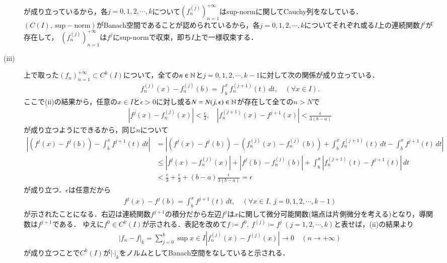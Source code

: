 \begin{prf}
\begin{description}
\begin{align}
	\end{align}
	が成り立っているから，各$j = 0,1,2,\cdots,k$について$\left(f_n^{(j)}\right)_{n=1}^{+\infty}$はsup-normに関してCauchy列をなしている．
	$(C(I),\ \mathrm{sup-norm})$がBanach空間であることが認められているから，各$j = 0,1,2,\cdots,k$についてそれぞれ或る$I$上の連続関数$f^j$が存在して，
	$\left(f_n^{(j)}\right)_{n=1}^{+\infty}$は$f^j$にsup-normで収束，即ち$I$上で一様収束する．\\
	\item[\rm{(iii)}] 上で取った$(f_n)_{n=1}^{+\infty} \subset C^k(I)$について，全ての$n \in \mathbb{N}$と$j = 0,1,2,\cdots,k-1$に対して次の関係が成り立っている．
	\begin{align}
		f_n^{(j)}(x) - f_n^{(j)}(b) = \int_{b}^{x} f_n^{(j+1)}(t)\, dt, \quad (\forall x \in I).
	\end{align}
	ここで(ii)の結果から，任意の$x \in I$と$\epsilon > 0$に対し或る$N = N(j,\epsilon) \in \mathbb{N}$が存在して全ての$n > N$で
	\begin{align}
		\left|f^j(x) - f_n^{(j)}(x)\right| < \frac{\epsilon}{3},\quad \left|f_n^{(j+1)}(x) - f^{j+1}(x)\right| < \frac{\epsilon}{3(b-a)}
	\end{align}
	が成り立つようにできるから，同じ$n$について
	\begin{align}
		\left|\left(f^j(x) - f^j(b)\right) - \int_{b}^{x} f^{j+1}(t)\, dt\right| 
		&= \left|\left(f^j(x) - f^j(b)\right) - \left(f_n^{(j)}(x) - f_n^{(j)}(b)\right)
			+ \int_{b}^{x} f_n^{(j+1)}(t)\, dt - \int_{b}^{x} f^{j+1}(t)\, dt\right| \\
		&\leq \left|f^j(x) - f_n^{(j)}(x)\right| + \left|f^j(b) - f_n^{(j)}(b)\right| 
			+ \int_{b}^{x} \left| f_n^{(j+1)}(t) - f^{j+1}(t) \right|\, dt \\
		&< \frac{\epsilon}{3} + \frac{\epsilon}{3} + (b-a) \frac{\epsilon}{3(b-a)} = \epsilon
 	\end{align}
 	が成り立つ．$\epsilon$は任意だから
 	\begin{align}
 		f^j(x) - f^j(b) = \int_{b}^{x} f^{j+1}(t)\, dt, \quad (\forall x \in I,\ j=0,1,2,\cdots,k-1)
 	\end{align}
 	が示されたことになる．右辺は連続関数$f^{j+1}$の積分だから左辺$f^j$は$x$に関して微分可能関数(端点は片側微分を考える)となり，導関数は$f^{j+1}$である．
 	ゆえに$f^0 \in C^k(I)$が示される．表記を改めて$f \coloneqq f^0,\ f^{(j)} \coloneqq f^j\ (j=1,2,\cdots,k)$と表せば，(ii)の結果より
 	\begin{align}
 		|f_n - f|_k = \sum_{j=0}^{k}\sup{x \in I}{\left|f_n^{(j)}(x) - f^{(j)}(x)\right|} \longrightarrow 0\quad (n \rightarrow +\infty)
 	\end{align}
 	が成り立つことで$C^k(I)$が$|\cdot|_k$をノルムとしてBanach空間をなしていると示される．
 	\QED
 	\end{description}
\end{prf}

